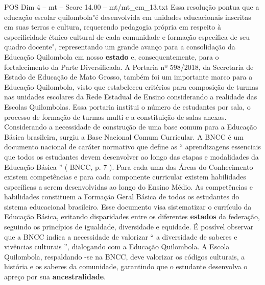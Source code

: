 \begin{textsample}{POS Dim 4 – mt – Score 14.00 – mt/mt\_em\_13.txt}
Essa resolução pontua que a educação escolar quilombola"é desenvolvida em unidades educacionais inscritas em suas terras e cultura, requerendo pedagogia própria em respeito à especificidade étnico-cultural de cada comunidade e formação específica de seu quadro docente", representando um grande avanço para a consolidação da Educação Quilombola em nosso \textbf{estado} e, consequentemente, para o fortalecimento da Parte Diversificada.
A Portaria nº 598/2018, da Secretaria de Estado de Educação de Mato Grosso, também foi um importante marco para a Educação Quilombola, visto que estabeleceu critérios para composição de turmas nas unidades escolares da Rede Estadual de Ensino considerando a realidade das Escolas Quilombolas.
Essa portaria institui o número de estudantes por sala, o processo de formação de turmas multi e a constituição de salas anexas.
Considerando a necessidade de construção de uma base comum para a Educação Básica brasileira, surgiu a Base Nacional Comum Curricular.
A BNCC é um documento nacional de caráter normativo que define as “ aprendizagens essenciais que todos os estudantes devem desenvolver ao longo das etapas e modalidades da Educação Básica ” ( BNCC, p. 7 ).
Para cada uma das Áreas do Conhecimento existem competências e para cada componente curricular existem habilidades específicas a serem desenvolvidas ao longo do Ensino Médio.
As competências e habilidades constituem a Formação Geral Básica de todos os estudantes do sistema educacional brasileiro.
Esse documento visa sistematizar o currículo da Educação Básica, evitando disparidades entre os diferentes \textbf{estados} da federação, seguindo os princípios de igualdade, diversidade e equidade.
É possível observar que a BNCC indica a necessidade de valorizar “ a diversidade de saberes e vivências culturais ”, dialogando com a Educação Quilombola.
A Escola Quilombola, respaldando -se na BNCC, deve valorizar os códigos culturais, a história e os saberes da comunidade, garantindo que o estudante desenvolva o apreço por sua \textbf{ancestralidade}.

\end{textsample}

